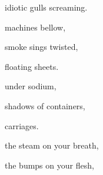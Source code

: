 \documentclass[extrafontsizes, 48pt]{memoir}
\begin{document}
	\begin{minipage}{.6\textwidth}
	idiotic gulls screaming.
	\end{minipage}
	\newpage

	\begin{minipage}{.6\textwidth}
	machines bellow,
	\end{minipage}
	\newpage

	\begin{minipage}{.6\textwidth}
	smoke sings twisted,
	\end{minipage}
	\newpage

	\begin{minipage}{.6\textwidth}
	floating sheets.
	\end{minipage}
	\newpage

	\begin{minipage}{.6\textwidth}
	under sodium,
	\end{minipage}
	\newpage

	\begin{minipage}{.6\textwidth}
	shadows of containers,
	\end{minipage}
	\newpage

	\begin{minipage}{.6\textwidth}
	carriages.
	\end{minipage}
	\newpage

	\begin{minipage}{.6\textwidth}
	the steam on your breath,
	\end{minipage}
	\newpage

	\begin{minipage}{.6\textwidth}
	the bumps on your flesh,
	\end{minipage}
	\newpage
\end{document}
